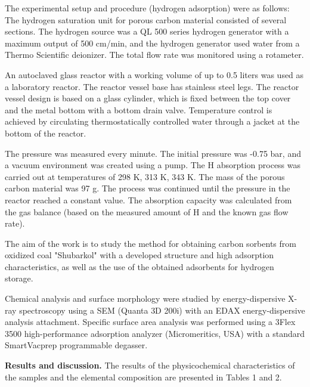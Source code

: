 \begin{multicols}{2}
The experimental setup and procedure (hydrogen adsorption) were as
follows: The hydrogen saturation unit for porous carbon material
consisted of several sections. The hydrogen source was a QL 500 series
hydrogen generator with a maximum output of 500
cm/min, and the hydrogen generator used water from a
Thermo Scientific deionizer. The total flow rate was monitored using a
rotameter.

An autoclaved glass reactor with a working volume of up to 0.5 liters
was used as a laboratory reactor. The reactor vessel base has stainless
steel legs. The reactor vessel design is based on a glass cylinder,
which is fixed between the top cover and the metal bottom with a bottom
drain valve. Temperature control is achieved by circulating
thermostatically controlled water through a jacket at the bottom of the
reactor.

The pressure was measured every minute. The initial pressure was -0.75
bar, and a vacuum environment was created using a pump. The
H absorption process was carried out at temperatures of
298 K, 313 K, 343 K. The mass of the porous carbon material was 97 g.
The process was continued until the pressure in the reactor reached a
constant value. The absorption capacity was calculated from the gas
balance (based on the measured amount of H and the
known gas flow rate).

The aim of the work is to study the method for obtaining carbon sorbents
from oxidized coal "Shubarkol" with a developed structure and high
adsorption characteristics, as well as the use of the obtained
adsorbents for hydrogen storage.

Chemical analysis and surface morphology were studied by
energy-dispersive X-ray spectroscopy using a SEM (Quanta 3D 200i) with
an EDAX energy-dispersive analysis attachment. Specific surface area
analysis was performed using a 3Flex 3500 high-performance adsorption
analyzer (Micromeritics, USA) with a standard SmartVacprep programmable
degasser.

{\bfseries Results and discussion.} The results of the physicochemical
characteristics of the samples and the elemental composition are
presented in Tables 1 and 2.
\end{multicols}

